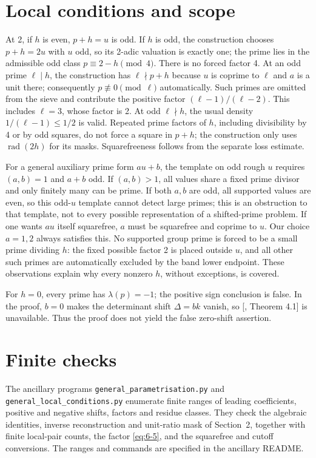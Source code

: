 \documentclass[11pt]{article}
\theoremstyle{definition}
\theoremstyle{definition}
\begin{document}
\section{Local conditions and scope}\label{sec:s10}

At 2, if \(h\) is even, \(p+h=u\) is odd. If \(h\) is odd, the construction chooses \(p+h=2u\) with \(u\) odd, so its 2-adic valuation is exactly one; the prime lies in the admissible odd class \(p\equiv2-h\pmod4\). There is no forced factor 4. At an odd prime \(\ell\mid h\), the construction has \(\ell\nmid p+h\) because \(u\) is coprime to \(\ell\) and \(a\) is a unit there; consequently \(p\not\equiv0\pmod\ell\) automatically. Such primes are omitted from the sieve and contribute the positive factor \((\ell-1)/(\ell-2)\). This includes \(\ell=3\), whose factor is 2. At odd \(\ell\nmid h\), the usual density \(1/(\ell-1)\le1/2\) is valid. Repeated prime factors of \(h\), including divisibility by 4 or by odd squares, do not force a square in \(p+h\); the construction only uses \(\operatorname{rad}(2h)\) for its masks. Squarefreeness follows from the separate loss estimate.

For a general auxiliary prime form \(au+b\), the template on odd rough \(u\) requires \((a,b)=1\) and \(a+b\) odd. If \((a,b)>1\), all values share a fixed prime divisor and only finitely many can be prime. If both \(a,b\) are odd, all supported values are even, so this odd-\(u\) template cannot detect large primes; this is an obstruction to that template, not to every possible representation of a shifted-prime problem. If one wants \(au\) itself squarefree, \(a\) must be squarefree and coprime to \(u\). Our choice \(a=1,2\) always satisfies this. No supported group prime is forced to be a small prime dividing \(h\): the fixed possible factor 2 is placed outside \(u\), and all other such primes are automatically excluded by the band lower endpoint. These observations explain why every nonzero \(h\), without exceptions, is covered.

For \(h=0\), every prime has \(\lambda(p)=-1\); the positive sign conclusion is false. In the proof, \(b=0\) makes the determinant shift \(\Delta=bk\) vanish, so [, Theorem 4.1] is unavailable. Thus the proof does not yield the false zero-shift assertion.



\section*{Finite checks}
The ancillary programs \texttt{general\_parametrisation.py} and
\texttt{general\_local\_conditions.py} enumerate finite ranges of
leading coefficients, positive and negative shifts, factors and residue
classes. They check the algebraic identities, inverse reconstruction and
unit-ratio mask of Section~2, together with finite local-pair counts,
the factor \eqref{eq:6-5}, and the squarefree and cutoff conversions.
The ranges and commands are specified in the ancillary README.
\end{document}
